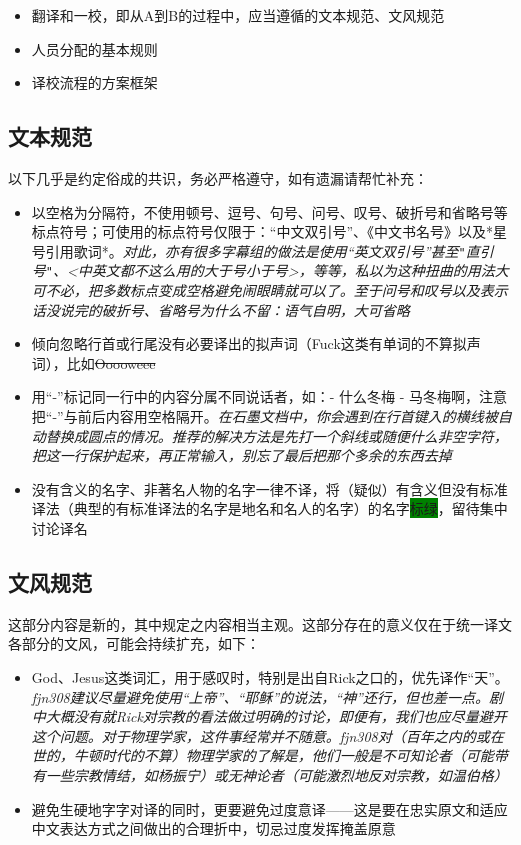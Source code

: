 \documentclass{ctexart}
\begin{document}
\begin{itemize}
    \item 翻译和一校，即从A到B的过程中，应当遵循的文本规范、文风规范
    \item 人员分配的基本规则
    \item 译校流程的方案框架
\end{itemize}

\subsection{文本规范}

以下几乎是约定俗成的共识，务必严格遵守，如有遗漏请帮忙补充：

\begin{itemize}
    \item 以空格为分隔符，不使用顿号、逗号、句号、问号、叹号、破折号和省略号等标点符号；可使用的标点符号仅限于：“中文双引号”、《中文书名号》以及*星号引用歌词*。\emph{\small 对此，亦有很多字幕组的做法是使用``英文双引号''甚至\texttt{"}直引号\texttt{"}、<中英文都不这么用的大于号小于号>，等等，私以为这种扭曲的用法大可不必，把多数标点变成空格避免闹眼睛就可以了。至于问号和叹号以及表示话没说完的破折号、省略号为什么不留：语气自明，大可省略}
    \item 倾向忽略行首或行尾没有必要译出的拟声词（Fuck这类有单词的不算拟声词），比如\sout{Ooooweee}
    \item 用“-”标记同一行中的内容分属不同说话者，如：- 什么冬梅 - 马冬梅啊，注意把“-”与前后内容用空格隔开。\emph{\small 在石墨文档中，你会遇到在行首键入的横线被自动替换成圆点的情况。推荐的解决方法是先打一个斜线或随便什么非空字符，把这一行保护起来，再正常输入，别忘了最后把那个多余的东西去掉}
    \item 没有含义的名字、非著名人物的名字一律不译，将（疑似）有含义但没有标准译法（典型的有标准译法的名字是地名和名人的名字）的名字\colorbox{green}{标绿}，留待集中讨论译名
\end{itemize}

\subsection{文风规范}\label{trans}

这部分内容是新的，其中规定之内容相当主观。这部分存在的意义仅在于统一译文各部分的文风，可能会持续扩充，如下：

\begin{itemize}
    \item God、Jesus这类词汇，用于感叹时，特别是出自Rick之口的，优先译作“天”。\emph{\small fjn308建议尽量避免使用“上帝”、“耶稣”的说法，“神”还行，但也差一点。剧中大概没有就Rick对宗教的看法做过明确的讨论，即便有，我们也应尽量避开这个问题。对于物理学家，这件事经常并不随意。fjn308对（百年之内的或在世的，牛顿时代的不算）物理学家的了解是，他们一般是不可知论者（可能带有一些宗教情结，如杨振宁）或无神论者（可能激烈地反对宗教，如温伯格）}
    \item 避免生硬地字字对译的同时，更要避免过度意译——这是要在忠实原文和适应中文表达方式之间做出的合理折中，切忌过度发挥掩盖原意
\end{itemize}
\end{document}
